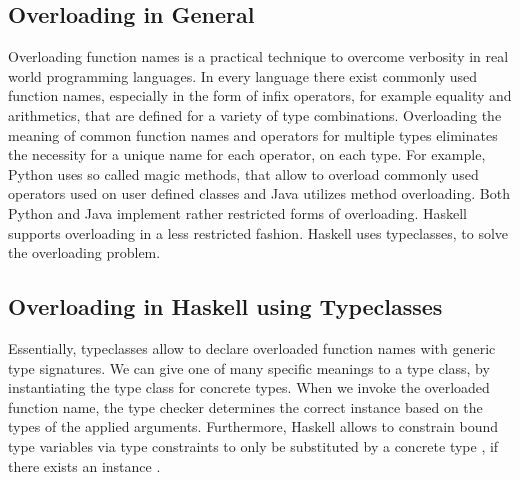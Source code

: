 \subsection{Overloading in General}
Overloading function names is a practical technique to overcome verbosity in real world programming languages. In every language there exist commonly used function names, especially in the form of infix operators, for example equality and arithmetics, that are defined for a variety of type combinations. Overloading the meaning of common function names and operators for multiple types eliminates the necessity for a unique name for each operator, on each type. 
For example, Python uses so called magic methods, that allow to overload commonly used operators used on user defined classes and Java utilizes method overloading. Both Python and Java implement rather restricted forms of overloading. Haskell supports overloading in a less restricted fashion. Haskell uses typeclasses, to solve the overloading problem.

\subsection{Overloading in Haskell using Typeclasses}
Essentially, typeclasses allow to declare overloaded function names with generic type signatures.
We can give one of many specific meanings to a type class, by instantiating the type class for concrete types.
When we invoke the overloaded function name, the type checker determines the correct instance based on the types of the applied arguments. 
Furthermore, Haskell allows to constrain bound type variables  via type constraints  to only be substituted by a concrete type , if there exists an instance  .

